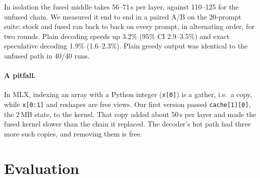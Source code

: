 \documentclass[11pt]{article}
\begin{document}
In isolation the fused middle takes 56--71\,\textmu s per layer, against 110--125 for the unfused chain. We measured it end to end in a paired A/B on the 20-prompt suite: stock and fused ran back to back on every prompt, in alternating order, for two rounds. Plain decoding speeds up 3.2\% (95\% CI 2.9--3.5\%) and exact speculative decoding 1.9\% (1.6--2.3\%). Plain greedy output was identical to the unfused path in 40/40 runs.

\paragraph{A pitfall.} In MLX, indexing an array with a Python integer (\texttt{x[0]}) is a gather, i.e.\ a copy, while \texttt{x[0:1]} and reshapes are free views. Our first version passed \texttt{cache[1][0]}, the 2\,MB state, to the kernel. That copy added about 50\,\textmu s per layer and made the fused kernel slower than the chain it replaced. The decoder's hot path had three more such copies, and removing them is free.

\section{Evaluation}
\label{sec:eval}
\end{document}
